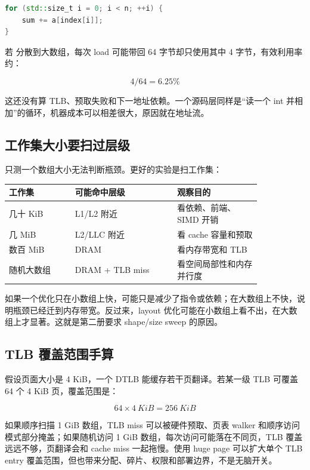 \begin{lstlisting}[language=C++,caption={随机索引扫描}]
for (std::size_t i = 0; i < n; ++i) {
    sum += a[index[i]];
}
\end{lstlisting}

若  分散到大数组，每次 load 可能带回 64 字节却只使用其中 4 字节，有效利用率约：

\[
4 / 64 = 6.25\%
\]

这还没有算 TLB、预取失败和下一地址依赖。一个源码层同样是“读一个 int 并相加”的循环，机器成本可以相差很大，原因就在地址流。

\subsection{工作集大小要扫过层级}

只测一个数组大小无法判断瓶颈。更好的实验是扫工作集：

\begin{center}
\begin{tabular}{p{0.22\linewidth}p{0.34\linewidth}p{0.28\linewidth}}
\toprule
工作集 & 可能命中层级 & 观察目的 \\
\midrule
几十 KiB & L1/L2 附近 & 看依赖、前端、SIMD 开销 \\
几 MiB & L2/LLC 附近 & 看 cache 容量和预取 \\
数百 MiB & DRAM & 看内存带宽和 TLB \\
随机大数组 & DRAM + TLB miss & 看空间局部性和内存并行度 \\
\bottomrule
\end{tabular}
\end{center}

如果一个优化只在小数组上快，可能只是减少了指令或依赖；在大数组上不快，说明瓶颈已经迁到内存带宽。反过来，layout 优化可能在小数组上看不出，在大数组上才显著。这就是第二册要求 shape/size sweep 的原因。

\subsection{TLB 覆盖范围手算}

假设页面大小是 4 KiB，一个 DTLB 能缓存若干页翻译。若某一级 TLB 可覆盖 64 个 4 KiB 页，覆盖范围是：

\[
64 \times 4\ KiB = 256\ KiB
\]

如果顺序扫描 1 GiB 数组，TLB miss 可以被硬件预取、页表 walker 和顺序访问模式部分掩盖；如果随机访问 1 GiB 数组，每次访问可能落在不同页，TLB 覆盖远远不够，页翻译会和 cache miss 一起拖慢。使用 huge page 可以扩大单个 TLB entry 覆盖范围，但也带来分配、碎片、权限和部署边界，不是无脑开关。


